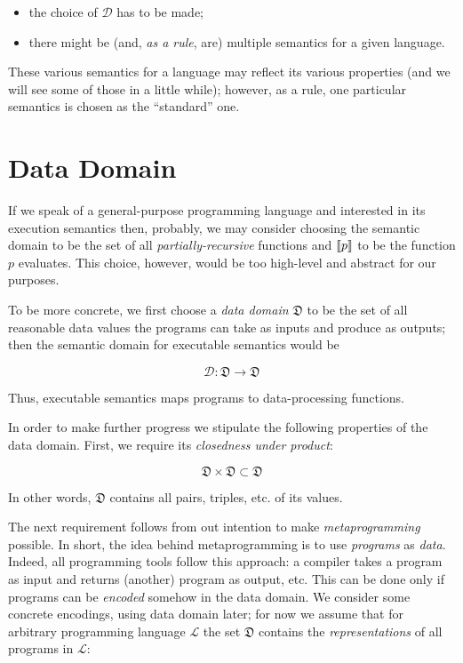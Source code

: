 \begin{itemize}
\item the choice of $\mathcal D$ has to be made;
\item there might be (and, \emph{as a rule}, are) multiple semantics for a given language.
\end{itemize}

These various semantics for a language may reflect its various properties (and we will see some of those in a little while); however, as a rule, one particular
semantics is chosen as the ``standard'' one.

\section{Data Domain}

If we speak of a general-purpose programming language and interested in its execution semantics then, probably, we may consider choosing the semantic domain
to be the set of all \emph{partially-recursive} functions and $\llbracket{p}\rrbracket$ to be the function $p$ evaluates. This choice, however, would be too high-level and
abstract for our purposes.

To be more concrete, we first choose a \emph{data domain} $\mathfrak D$ to be the set of all reasonable data values the programs can take as inputs and
produce as outputs; then the semantic domain for executable semantics would be

\[
\mathcal{D}:\mathfrak{D}\to\mathfrak{D}
\]

Thus, executable semantics maps programs to data-processing functions.

In order to make further progress we stipulate the following properties of the data domain. First, we require its \emph{closedness under product}:

\[
\mathfrak{D}\times\mathfrak{D}\subset\mathfrak{D}
\]

In other words, $\mathfrak{D}$ contains all pairs, triples, etc. of its values.

The next requirement follows from out intention to make \emph{metaprogramming} possible. In short, the idea behind metaprogramming is
to use \emph{programs} as \emph{data}. Indeed, all programming tools follow this approach: a compiler takes a program as input and
returns (another) program as output, etc. This can be done only if programs can be \emph{encoded} somehow in the data domain. We
consider some concrete encodings, using \lama data domain later; for now we assume that for arbitrary programming language $\mathcal{L}$
the set $\mathfrak{D}$ contains the \emph{representations}
of all programs in $\mathcal{L}$:

